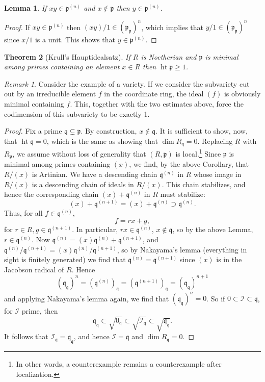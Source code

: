 \documentclass{article}
\newcommand{\fr}{\mathfrak}
\DeclareMathOperator{\hgt}{ht}
\theoremstyle{plain}
\newtheorem{thm}{Theorem}
\newtheorem{lem}[thm]{Lemma}
\theoremstyle{definition}
\theoremstyle{remark}
\newtheorem*{rem}{Remark}
\begin{document}
\begin{lem}
    If $xy\in \fr p^{(n)}$ and $x\notin\fr p$ then $y\in\fr p^{(n)}$.
\end{lem}
\begin{proof}
    If $xy\in\fr p^{(n)}$ then $(xy)/1\in(\fr p_{\fr p})^n$, which implies that $y/1\in(\fr p_{\fr p})^n$
    since $x/1$ is a unit. This shows that $y\in\fr p^{(n)}$.
\end{proof}

\begin{thm}[Krull's Hauptidealsatz]
    If $R$ is Noetherian and $\fr p$ is minimal among primes containing an element $x\in R$ then
    $\hgt\fr p\geq 1$.
\end{thm}

\begin{rem}
    Consider the example of a variety. If we consider the subvariety cut out
    by an irreducible element $f$ in the coordinate ring, the ideal $(f)$ is obviously minimal
    containing $f$. This, together with the two estimates above, force the codimension of this
    subvariety to be exactly 1.
\end{rem}

\begin{proof}
    Fix a prime $\fr q\subsetneq\fr p$. By construction, $x\notin\fr q$. It is sufficient to
    show, now, that $\hgt\fr q=0$, which is the same as showing that $\dim R_{\fr q}=0$.
    Replacing $R$ with $R_{\fr p}$, we assume without loss of generality that $(R,\fr p)$ is local.\footnote{In
    other words, a counterexample remains a counterexample after localization.}
    Since $\fr p$ is minimal among primes containing $(x)$, we find, by
    the above Corollary, that $R/(x)$ is Artinian. We have a descending chain $\fr q^{(n)}$ in $R$
    whose image in $R/(x)$ is a descending chain of ideals in $R/(x)$.
    This chain stabilizes, and hence the corresponding chain $(x)+\fr q^{(n)}$ in $R$ must stabilize:
    \[(x)+\fr q^{(n+1)}=(x)+\fr q^{(n)}\supset\fr q^{(n)}.\]
    Thus, for all $f\in\fr q^{(n)}$, \[f=rx+g,\] for $r\in R,g\in\fr q^{(n+1)}$.
    In particular, $rx\in\fr q^{(n)}$, $x\notin\fr q$, so by the above Lemma, $r\in\fr q^{(n)}$.
    Now $\fr q^{(n)}=(x)\fr q^{(n)}+\fr q^{(n+1)}$, and $\fr q^{(n)}/\fr q^{(n+1)}=(x)\fr q^{(n)}/\fr q^{(n+1)}$,
    so by Nakayama's lemma (everything in sight is finitely generated) we find that $\fr q^{(n)}=\fr q^{(n+1)}$
    since $(x)$ is in the Jacobson radical of $R$. Hence
    \[(\fr q_{\fr q})^n=(\fr q^{(n)})_{\fr q}=(\fr q^{(n+1)})_{\fr q}=(\fr q_{\fr q})^{n+1}\]
    and applying Nakayama's lemma again, we find that $(\fr q_{\fr q})^n=0$.
    So if $0\subset\mathcal{I}\subset\fr q$, for $\mathcal{I}$ prime, then 
    \[\fr q_{\fr q}\subset \sqrt{0_{\fr q}}\subset\sqrt{\mathcal{I}_{\fr q}}\subset \sqrt{\fr q_{\fr q}}.\]
    It follows that $\mathcal{I}_{\fr q}=\fr q_{\fr q}$, and hence $\mathcal{I}=\fr q$ and $\dim R_{\fr q}=0$.
\end{proof}
\end{document}
